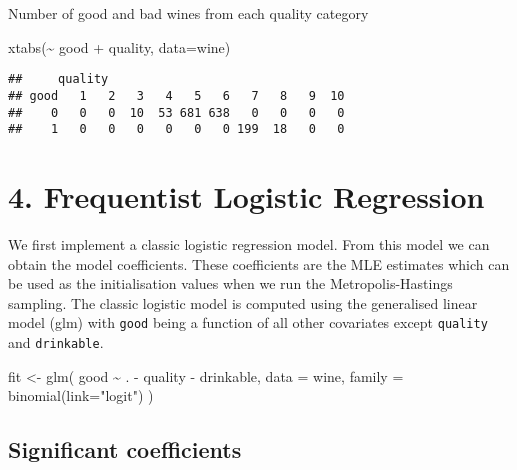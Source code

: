 \documentclass[
]{article}
\newenvironment{Shaded}{\begin{snugshade}}{\end{snugshade}}
\newcommand{\AttributeTok}[1]{\textcolor[rgb]{0.77,0.63,0.00}{#1}}
\newcommand{\FunctionTok}[1]{\textcolor[rgb]{0.00,0.00,0.00}{#1}}
\newcommand{\NormalTok}[1]{#1}
\newcommand{\OtherTok}[1]{\textcolor[rgb]{0.56,0.35,0.01}{#1}}
\newcommand{\SpecialCharTok}[1]{\textcolor[rgb]{0.00,0.00,0.00}{#1}}
\newcommand{\StringTok}[1]{\textcolor[rgb]{0.31,0.60,0.02}{#1}}
\begin{document}
Number of good and bad wines from each quality category

\begin{Shaded}
\begin{Highlighting}[]
\FunctionTok{xtabs}\NormalTok{(}\SpecialCharTok{\textasciitilde{}}\NormalTok{ good }\SpecialCharTok{+}\NormalTok{ quality, }\AttributeTok{data=}\NormalTok{wine)}
\end{Highlighting}
\end{Shaded}

\begin{verbatim}
##     quality
## good   1   2   3   4   5   6   7   8   9  10
##    0   0   0  10  53 681 638   0   0   0   0
##    1   0   0   0   0   0   0 199  18   0   0
\end{verbatim}

\hypertarget{frequentist-logistic-regression}{%
\section{4. Frequentist Logistic
Regression}\label{frequentist-logistic-regression}}

We first implement a classic logistic regression model. From this model
we can obtain the model coefficients. These coefficients are the MLE
estimates which can be used as the initialisation values when we run the
Metropolis-Hastings sampling. The classic logistic model is computed
using the generalised linear model (glm) with \texttt{good} being a
function of all other covariates except \texttt{quality} and
\texttt{drinkable}.

\begin{Shaded}
\begin{Highlighting}[]
\NormalTok{fit }\OtherTok{\textless{}{-}} \FunctionTok{glm}\NormalTok{(}
\NormalTok{  good }\SpecialCharTok{\textasciitilde{}}\NormalTok{ . }\SpecialCharTok{{-}}\NormalTok{ quality }\SpecialCharTok{{-}}\NormalTok{ drinkable,}
  \AttributeTok{data =}\NormalTok{ wine,}
  \AttributeTok{family =} \FunctionTok{binomial}\NormalTok{(}\AttributeTok{link=}\StringTok{"logit"}\NormalTok{)}
\NormalTok{)}
\end{Highlighting}
\end{Shaded}

\hypertarget{significant-coefficients}{%
\subsection{Significant coefficients}\label{significant-coefficients}}
\end{document}
